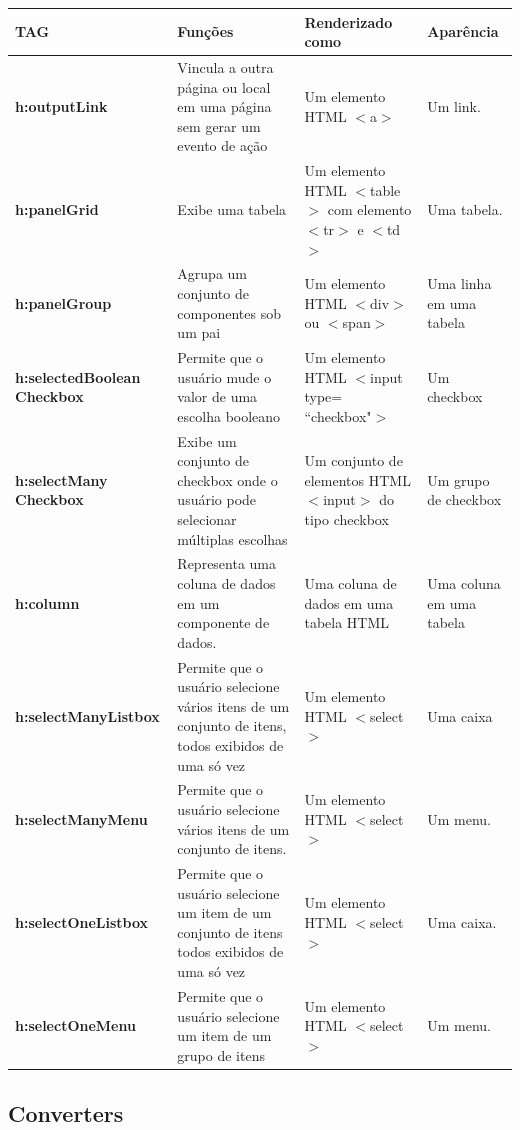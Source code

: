\documentclass[	DIV=calc,%
							paper=a4,%
							fontsize=12pt,%
							onecolumn]{scrartcl}	 					%
\begin{document}
\begin{center}
\begin{tabular}{ | p{4cm} | p{4cm} | p{4cm} | p{3.5cm} |}
\hline
\textbf{ TAG} & \textbf{ Funções} & \textbf{ Renderizado como} & \textbf{ Aparência} \\ \hline
\textbf{h:outputLink} & Vincula a outra página ou local em uma página sem gerar um evento de ação & Um elemento HTML $<$a$>$ & Um link.\\ \hline
\textbf{h:panelGrid} & Exibe uma tabela & Um elemento HTML $<$table$>$ com elemento $<$tr$>$ e $<$td$>$ & Uma tabela.\\ \hline
\textbf{h:panelGroup} & Agrupa um conjunto de componentes sob um pai & Um elemento HTML $<$div$>$ ou $<$span$>$ & Uma linha em uma tabela\\ \hline
\textbf{h:selectedBoolean Checkbox} & Permite que o usuário mude o valor de uma  escolha booleano & Um elemento HTML $<$input type= “checkbox"$>$ & Um checkbox\\ \hline
\textbf{h:selectMany Checkbox} & Exibe um conjunto de checkbox onde o usuário pode selecionar múltiplas escolhas & Um conjunto de elementos HTML $<$input$>$ do tipo checkbox & Um grupo de checkbox\\ \hline
\textbf{h:column} & Representa uma coluna de dados em um componente de dados. & Uma coluna de dados em uma tabela HTML & Uma coluna em uma tabela\\ \hline
\textbf{h:selectManyListbox} & Permite que o usuário selecione vários itens de um conjunto de itens, todos exibidos de uma só vez & Um elemento HTML $<$select$>$ & Uma caixa\\ \hline
\textbf{h:selectManyMenu} & Permite que o usuário selecione vários itens de um conjunto de itens. & Um elemento HTML $<$select$>$ & Um menu.\\ \hline
\textbf{h:selectOneListbox} & Permite que o usuário selecione um item de um conjunto de itens todos exibidos de uma só vez & Um elemento HTML $<$select$>$ & Uma caixa.\\ \hline
\textbf{h:selectOneMenu} & Permite que o usuário selecione um item de um grupo de itens & Um elemento HTML $<$select$>$ & Um menu.\\ \hline
\end{tabular}
\end{center}


\subsection{Converters}
\end{document}

